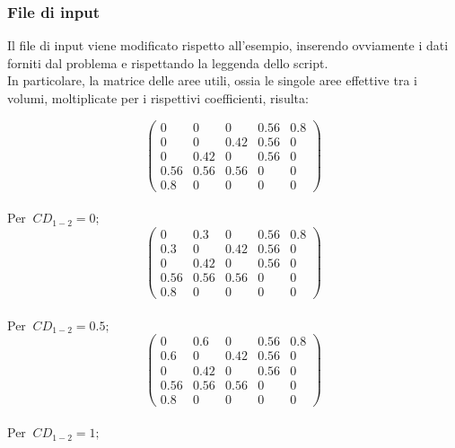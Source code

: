 \documentclass{article}
\begin{document}
        \subsubsection{File di input}

        Il file di input viene modificato rispetto all'esempio, 
        inserendo ovviamente i dati forniti dal problema e rispettando la leggenda
        dello script.\\ 
        In particolare, la matrice delle aree utili, ossia le singole aree effettive tra i volumi, moltiplicate
        per i rispettivi coefficienti, risulta: \\
        \begin{center}  
            \[
            \begin{pmatrix}
                0    & 0    & 0        & 0.56 & 0.8\\ 
                0    & 0    & 0.42     & 0.56 & 0\\ 
                0    & 0.42 & 0        & 0.56 & 0\\ 
                0.56 & 0.56 & 0.56     & 0    & 0\\
                0.8  & 0    & 0        & 0    & 0 
            \end{pmatrix}
            \]
            \\ 
            Per $\ CD_{1-2} = 0;$ \
            \\ 
            \[
            \begin{pmatrix}
                0    & 0.3  & 0        & 0.56 & 0.8\\ 
                0.3  & 0    & 0.42     & 0.56 & 0\\ 
                0    & 0.42 & 0        & 0.56 & 0\\ 
                0.56 & 0.56 & 0.56     & 0    & 0\\
                0.8  & 0    & 0        & 0    & 0 
            \end{pmatrix}
            \]
            \\ 
            Per $\ CD_{1-2} = 0.5;$ \
            \\ 
            \[
            \begin{pmatrix}
                0    & 0.6  & 0        & 0.56 & 0.8\\ 
                0.6  & 0    & 0.42     & 0.56 & 0\\ 
                0    & 0.42 & 0        & 0.56 & 0\\ 
                0.56 & 0.56 & 0.56     & 0    & 0\\
                0.8  & 0    & 0        & 0    & 0 
            \end{pmatrix}
            \]
            \\ 
            Per $\ CD_{1-2} = 1;$ \
        \end{center}    
        \pagebreak
\end{document}
